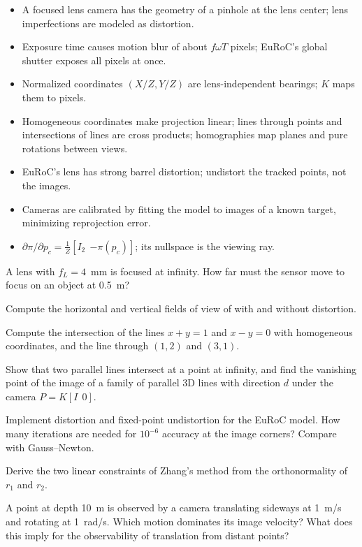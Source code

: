 \begin{takeaways}
\begin{itemize}
  \item A focused lens camera has the geometry of a pinhole at the lens center; lens imperfections are modeled as distortion.
  \item Exposure time causes motion blur of about $f\omega T$ pixels; EuRoC's global shutter exposes all pixels at once.
  \item Normalized coordinates $(X/Z, Y/Z)$ are lens-independent bearings; $K$ maps them to pixels.
  \item Homogeneous coordinates make projection linear; lines through points and intersections of lines are cross products; homographies map planes and pure
        rotations between views.
  \item EuRoC's lens has strong barrel distortion; undistort the tracked points, not the images.
  \item Cameras are calibrated by fitting the model to images of a known target, minimizing reprojection error.
  \item $\partial\pi/\partial p_c = \frac1Z[I_2\ \ {-\pi(p_c)}]$; its nullspace is the viewing ray.
\end{itemize}
\end{takeaways}

\begin{exercises}
  \item A lens with $f_L = 4$~mm is focused at infinity. How far must the sensor move to focus on an object at 0.5~m?
  \item Compute the horizontal and vertical fields of view of  with and without distortion.
  \item Compute the intersection of the lines $x + y = 1$ and $x - y = 0$ with homogeneous coordinates, and the line through $(1, 2)$ and $(3, 1)$.
  \item Show that two parallel lines intersect at a point at infinity, and find the vanishing point of the image of a family of parallel 3D lines with
        direction $d$ under the camera $P = K[I\ \ 0]$.
  \item Implement distortion and fixed-point undistortion for the EuRoC model. How many iterations are needed for $10^{-6}$ accuracy at the image corners? Compare
        with Gauss--Newton.
  \item Derive the two linear constraints of Zhang's method from the orthonormality of $r_1$ and $r_2$.
  \item A point at depth 10~m is observed by a camera translating sideways at 1~m/s and rotating at 1~rad/s. Which motion dominates its image velocity? What does
        this imply for the observability of translation from distant points?
\end{exercises}

